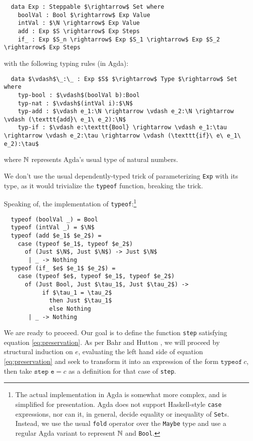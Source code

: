 \documentclass[manuscript,screen,sigplan]{acmart}
\begin{document}
\begin{lstlisting}
  data Exp : Steppable $\rightarrow$ Set where
    boolVal : Bool $\rightarrow$ Exp Value
    intVal : $\N \rightarrow$ Exp Value
    add : Exp $S \rightarrow$ Exp Steps
    if_ : Exp $S_n \rightarrow$ Exp $S_1 \rightarrow$ Exp $S_2 \rightarrow$ Exp Steps
\end{lstlisting}

with the following typing rules (in Agda):

\begin{lstlisting}
  data $\vdash$\_:\_ : Exp $S$ $\rightarrow$ Type $\rightarrow$ Set where
    typ-bool : $\vdash$(boolVal b):Bool
    typ-nat : $\vdash$(intVal i):$\N$
    typ-add : $\vdash e_1:\N \rightarrow \vdash e_2:\N \rightarrow \vdash (\texttt{add}\ e_1\ e_2):\N$
    typ-if : $\vdash e:\texttt{Bool} \rightarrow \vdash e_1:\tau \rightarrow \vdash e_2:\tau \rightarrow \vdash (\texttt{if}\ e\ e_1\ e_2):\tau$
\end{lstlisting}

where $\mathbb{N}$ represents Agda's usual type of natural numbers.

We don't use the usual dependently-typed trick of parameterizing
\texttt{Exp} with its type, as it would trivialize the \texttt{typeof}
function, breaking the trick.

Speaking of, the implementation of \texttt{typeof}:\footnote{The actual
implementation in Agda is somewhat more complex, and is simplified for
presentation. Agda does not support Haskell-style \texttt{case} expressions,
nor can it, in general, decide equality or inequality of \texttt{Set}s.
Instead, we use the usual \texttt{fold} operator over the \texttt{Maybe}
type and use a regular Agda variant to represent $\mathbb{N}$ and \texttt{Bool}.}

\begin{lstlisting}
  typeof (boolVal _) = Bool
  typeof (intVal _) = $\N$
  typeof (add $e_1$ $e_2$) =
    case (typeof $e_1$, typeof $e_2$)
      of (Just $\N$, Just $\N$) -> Just $\N$
       | _ -> Nothing
  typeof (if_ $e$ $e_1$ $e_2$) =
    case (typeof $e$, typeof $e_1$, typeof $e_2$)
      of (Just Bool, Just $\tau_1$, Just $\tau_2$) ->
           if $\tau_1 = \tau_2$
             then Just $\tau_1$
             else Nothing
       | _ -> Nothing
\end{lstlisting}

We are ready to proceed. Our goal is to define the function \texttt{step}
satisfying equation \ref{eq:preservation}. As per Bahr and Hutton
\cite{bahr:2015}, we will proceed by structural induction on $e$, evaluating
the left hand side of equation \ref{eq:preservation} and seek to transform it
into an expression of the form $\texttt{typeof}\ c$, then take $\texttt{step e}
= c$ as a definition for that case of \texttt{step}.
\end{document}
